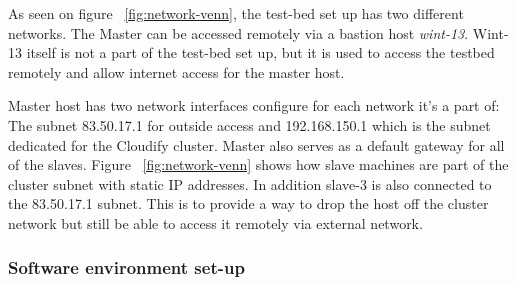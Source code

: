 As seen on figure ~\ref{fig:network-venn}, the test-bed set up has two different networks. The Master can be accessed remotely via a bastion host \textit{wint-13}. Wint-13 itself is not a part of the test-bed set up, but it is used to access the testbed remotely and allow internet access for the master host.

Master host has two network interfaces configure for each network it's a part of: The subnet 83.50.17.1 for outside access and 192.168.150.1 which is the subnet dedicated for the Cloudify cluster. Master also serves as a default gateway for all of the slaves. Figure ~\ref{fig:network-venn} shows how slave machines are part of the cluster subnet with static IP addresses. In addition slave-3 is also connected to the 83.50.17.1 subnet. This is to provide a way to drop the host off the cluster network but still be able to access it remotely via external network.

\subsubsection{Software environment set-up}